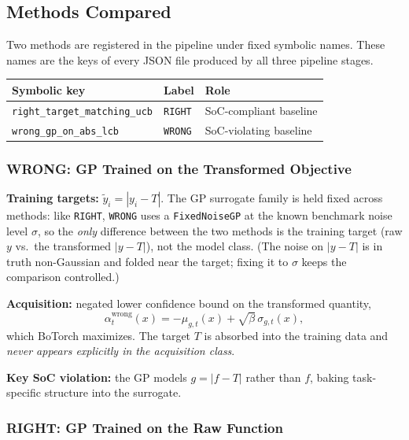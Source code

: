 \documentclass[11pt]{article}
\newcommand{\RIGHT}{\texttt{RIGHT}}
\newcommand{\WRONG}{\texttt{WRONG}}
\begin{document}
\subsection{Methods Compared}
\label{sec:methods}
 
Two methods are registered in the pipeline under fixed symbolic names.
These names are the keys of every JSON file produced by all three pipeline stages.
 
\begin{center}
\begin{tabular}{lll}
\toprule
Symbolic key & Label & Role \\
\midrule
\texttt{right\_target\_matching\_ucb} & \RIGHT & SoC-compliant baseline \\
\texttt{wrong\_gp\_on\_abs\_lcb}      & \WRONG & SoC-violating baseline \\
\bottomrule
\end{tabular}
\end{center}
 
\subsubsection{WRONG: GP Trained on the Transformed Objective}
 
\textbf{Training targets:} $\tilde{y}_i = |y_i - T|$.
The GP surrogate family is held fixed across methods: like \RIGHT, \WRONG{}
uses a \texttt{FixedNoiseGP} at the known benchmark noise level $\sigma$, so the
\emph{only} difference between the two methods is the training target (raw $y$
vs.\ the transformed $|y-T|$), not the model class. (The noise on $|y-T|$ is in
truth non-Gaussian and folded near the target; fixing it to $\sigma$ keeps the
comparison controlled.)
 
\textbf{Acquisition:} negated lower confidence bound on the transformed quantity,
\[
  \alpha_t^{\mathrm{wrong}}(x)
  = -\mu_{g,t}(x) + \sqrt{\beta}\,\sigma_{g,t}(x),
\]
which BoTorch maximizes. The target $T$ is absorbed into the training data and
\emph{never appears explicitly in the acquisition class}.
 
\textbf{Key SoC violation:} the GP models $g = |f-T|$ rather than $f$, baking
task-specific structure into the surrogate.
 
\subsubsection{RIGHT: GP Trained on the Raw Function}
 
\end{document}
